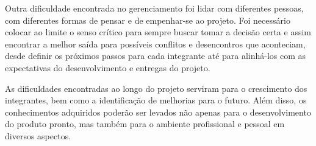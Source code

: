 Outra dificuldade encontrada no gerenciamento foi lidar com diferentes pessoas, com diferentes formas de pensar e de empenhar-se ao projeto. Foi necessário colocar ao limite o senso crítico para sempre buscar tomar a decisão certa e assim encontrar a melhor saída para possíveis conflitos e desencontros que aconteciam, desde definir os próximos passos para cada integrante até para alinhá-los com as expectativas do desenvolvimento e entregas do projeto.

As dificuldades encontradas ao longo do projeto serviram para o crescimento dos integrantes, bem como a identificação de melhorias para o futuro. Além disso, os conhecimentos adquiridos poderão ser levados não apenas para o desenvolvimento do produto pronto, mas também para o ambiente profissional e pessoal em diversos aspectos.

